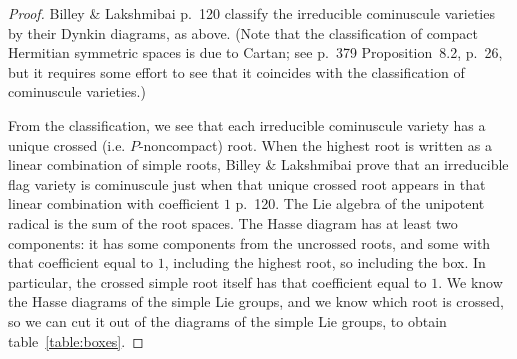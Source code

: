 \documentclass[a4paper,10pt]{amsart}
\theoremstyle{remark}
\begin{document}
\begin{proof}
Billey \& Lakshmibai \cite{Billey/Lakshmibai:2000} p.~120 classify the irreducible cominuscule varieties by their Dynkin diagrams, as above.
(Note that the classification of compact Hermitian symmetric spaces is due to Cartan; see \cite{Kostant:1961} p.~379 Proposition~8.2, \cite{Baston/Eastwood:1989} p.~26, but it requires some effort to see that it coincides with the classification of cominuscule varieties.)

From the classification, we see that each irreducible cominuscule variety has a unique crossed (i.e. \(P\)-noncompact) root.
When the highest root is written as a linear combination of simple roots, Billey \& Lakshmibai prove that an irreducible flag variety is cominuscule just when that unique crossed root appears in that linear combination with coefficient \(1\) \cite{Billey/Lakshmibai:2000} p.~120.
The Lie algebra of the unipotent radical is the sum of the root spaces.
The Hasse diagram has at least two components: it has some components from the uncrossed roots, and some with that coefficient equal to \(1\), including the highest root, so including the box.
In particular, the crossed simple root itself has that coefficient equal to \(1\).
We know the Hasse diagrams of the simple Lie groups, and we know which root is crossed, so we can cut it out of the diagrams of the simple Lie groups, to obtain table~\vref{table:boxes}.
\end{proof}

\end{document}
